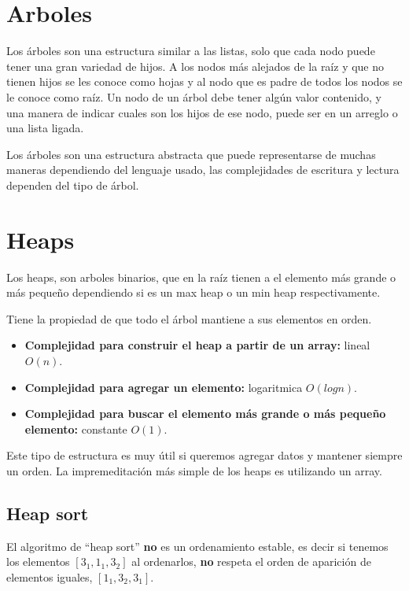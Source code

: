 \section{Arboles}

Los árboles son una estructura similar a las listas, solo que cada nodo puede tener una gran variedad de hijos. A los nodos más alejados de la raíz y que no tienen hijos se les conoce como hojas y al nodo que es padre de todos los nodos se le conoce como raíz. Un nodo de un árbol debe tener algún valor contenido, y una manera de indicar cuales son los hijos de ese nodo, puede ser en un arreglo o una lista ligada.

Los árboles son una estructura abstracta que puede representarse de muchas maneras dependiendo del lenguaje usado, las complejidades de escritura y lectura dependen del tipo de árbol.

\section{Heaps}

Los heaps, son arboles binarios, que en la raíz tienen a el elemento más grande o más pequeño dependiendo si es un max heap o un min heap respectivamente.

Tiene la propiedad de que todo el árbol mantiene a sus elementos en orden.

\begin{itemize}
    \item \textbf{Complejidad para construir el heap a partir de un array:} lineal $O(n)$.
    \item \textbf{Complejidad para agregar un elemento:} logaritmica $O(log n)$.
    \item \textbf{Complejidad para buscar el elemento más grande o más pequeño elemento:} constante $O(1)$.
\end{itemize}

Este tipo de estructura es muy útil si queremos agregar datos y mantener siempre un orden. La impremeditación más simple de los heaps es utilizando un array. 

\subsection{Heap sort}

El algoritmo de ``heap sort'' \textbf{no} es un ordenamiento estable, es decir si tenemos los elementos $[3_1, 1_1,3_2]$ al ordenarlos, \textbf{no} respeta el orden de aparición de elementos iguales, $[1_1,3_2,3_1]$.

